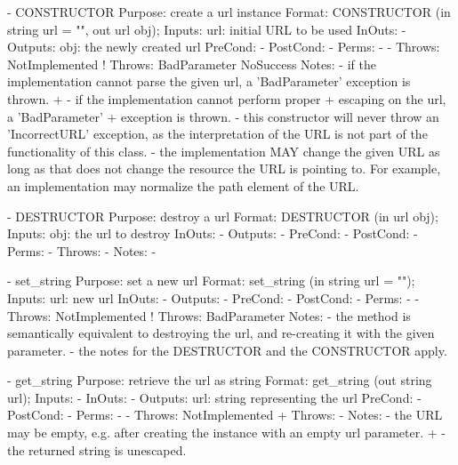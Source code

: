  \begin{myspec}
    - CONSTRUCTOR
      Purpose:  create a url instance
      Format:   CONSTRUCTOR          (in  string url = "",
                                      out url    obj);
      Inputs:   url:                  initial URL to be used
      InOuts:   -
      Outputs:  obj:                  the newly created url
      PreCond:  -
      PostCond: -
      Perms:    -
-     Throws:   NotImplemented
!     Throws:   BadParameter
                NoSuccess
      Notes:    - if the implementation cannot parse the given
                  url, a 'BadParameter' exception is thrown.
+               - if the implementation cannot perform proper
+                 escaping on the url, a 'BadParameter' 
+                 exception is thrown.
                - this constructor will never throw an
                  'IncorrectURL' exception, as the
                  interpretation of the URL is not part of the
                  functionality of this class.
                - the implementation MAY change the given
                  URL as long as that does not change the
                  resource the URL is pointing to.  For
                  example, an implementation may normalize the
                  path element of the URL.
 
 
    - DESTRUCTOR
      Purpose:  destroy a url
      Format:   DESTRUCTOR           (in  url obj);
      Inputs:   obj:                  the url to destroy
      InOuts:   -
      Outputs:  -
      PreCond:  -
      PostCond: -
      Perms:    -
      Throws:   -
      Notes:    -
 
 
    - set_string
      Purpose:  set a new url
      Format:   set_string           (in  string url = "");
      Inputs:   url:                  new url
      InOuts:   -
      Outputs:  -
      PreCond:  -
      PostCond: -
      Perms:    -
-     Throws:   NotImplemented
!     Throws:   BadParameter
      Notes:    - the method is semantically equivalent to
                  destroying the url, and re-creating it with
                  the given parameter.
                - the notes for the DESTRUCTOR and the 
                  CONSTRUCTOR apply.
 
 
    - get_string
      Purpose:  retrieve the url as string
      Format:   get_string           (out string url);
      Inputs:   -
      InOuts:   -
      Outputs:  url:                  string representing the url
      PreCond:  -
      PostCond: -
      Perms:    -
-     Throws:   NotImplemented
+     Throws:   -
      Notes:    - the URL may be empty, e.g. after creating the
                  instance with an empty url parameter.
+               - the returned string is unescaped.
 

\end{myspec}
